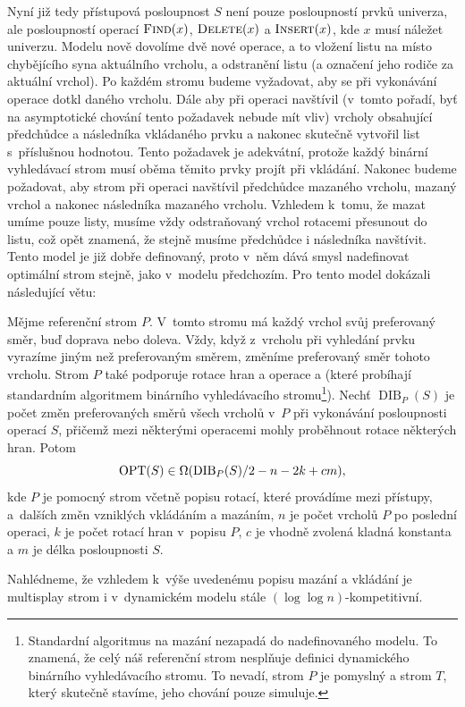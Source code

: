 Nyní již tedy přístupová posloupnost $S$ není pouze posloupností prvků
univerza, ale posloupností operací $\ope{Find}(x)$, $\ope{Delete}(x)$ a
$\ope{Insert}(x)$, kde $x$ musí náležet univerzu. Modelu nově dovolíme dvě
nové operace, a to vložení listu na místo chybějícího syna aktuálního vrcholu,
a odstranění listu (a označení jeho rodiče za aktuální vrchol). Po každém
stromu budeme vyžadovat, aby se při vykonávání operace  dotkl daného
vrcholu. Dále aby při operaci  navštívil (v~tomto pořadí, byť na
asymptotické chování tento požadavek nebude mít vliv) vrcholy obsahující
předchůdce a následníka vkládaného prvku a nakonec skutečně vytvořil list
s~příslušnou hodnotou. Tento požadavek je adekvátní, protože každý binární
vyhledávací strom musí oběma těmito prvky projít při vkládání. Nakonec budeme
požadovat, aby strom při operaci  navštívil předchůdce mazaného
vrcholu, mazaný vrchol a nakonec následníka mazaného vrcholu. Vzhledem k~tomu,
že mazat umíme pouze listy, musíme vždy odstraňovaný vrchol rotacemi přesunout
do listu, což opět znamená, že stejně musíme předchůdce i následníka navštívit.
Tento model je již dobře definovaný, proto v~něm dává smysl nadefinovat optimální strom stejně, jako v~modelu předchozím.
Pro tento model \citet{multisplay} dokázali následující větu:

\begin{veta}
\def\dib{\operatorname{DIB}}
Mějme referenční strom $P$. V~tomto stromu má každý vrchol svůj preferovaný
směr, buď doprava nebo doleva. Vždy, když z~vrcholu při vyhledání prvku vyrazíme
jiným než preferovaným směrem, změníme preferovaný směr tohoto vrcholu. Strom
$P$ také podporuje rotace hran a operace  a  (které
probíhají standardním algoritmem binárního vyhledávacího stromu\footnote{Standardní algoritmus na mazání nezapadá do nadefinovaného modelu. To
znamená, že celý náš referenční strom nesplňuje definici dynamického
binárního vyhledávacího stromu. To nevadí, strom $P$ je pomyslný a strom
$T$, který skutečně stavíme, jeho chování pouze simuluje.}). Nechť $\dib_P(S)$ je
počet změn preferovaných směrů všech vrcholů v~$P$ při vykonávání posloupnosti
operací $S$, přičemž mezi některými operacemi mohly proběhnout rotace některých
hran. Potom $$\opt(S) \in \Omega(\dib_P(S)/2 - n - 2k + cm),$$ kde $P$ je
pomocný strom včetně popisu rotací, které provádíme mezi přístupy, a~dalších
změn vzniklých vkládáním a mazáním, $n$ je počet vrcholů $P$ po poslední operaci, $k$
je počet rotací hran v~popisu $P$, $c$ je vhodně zvolená kladná konstanta a $m$
je délka posloupnosti $S$.  \end{veta}

Nahlédneme, že vzhledem k~výše uvedenému popisu mazání a vkládání je multisplay strom i v~dynamickém modelu stále $(\log\log n)$-kompetitivní. 

